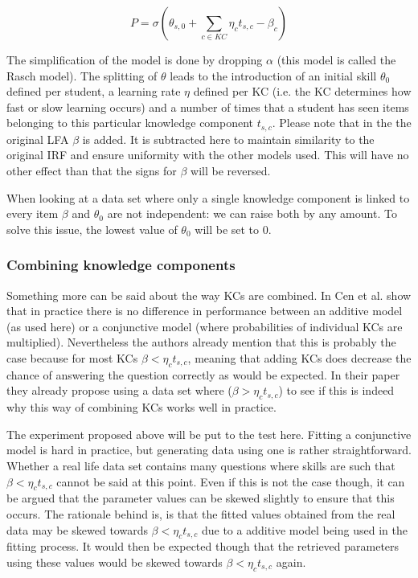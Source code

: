 \documentclass{article}
\begin{document}
\begin{equation}
P = \sigma(\theta_{s,0} + \sum_{c \in KC}  \eta_{c} t_{s,c} - \beta_{c})
\end{equation}

The simplification of the model is done by dropping $\alpha$ (this model is called the Rasch model). The splitting of $\theta$ leads to the introduction of an initial skill $\theta_{0}$ defined per student, a learning rate $\eta$ defined per KC (i.e. the KC determines how fast or slow learning occurs) and a number of times that a student has seen items belonging to this particular knowledge component $t_{s,c}$. Please note that in the the original LFA $\beta$ is added. It is subtracted here to maintain similarity to the original IRF and ensure uniformity with the other models used. This will have no other effect than that the signs for $\beta$ will be reversed.

When looking at a data set where only a single knowledge component is linked to every item $\beta$ and $\theta_{0}$ are not independent: we can raise both by any amount. To solve this issue, the lowest value of $\theta_{0}$ will be set to 0.
\subsubsection{Combining knowledge components}
\label{sec:comb}
Something more can be said about the way KCs are combined. In \cite{skillcombi} Cen et al. show that in practice there is no difference in performance between an additive model (as used here) or a conjunctive model (where probabilities of individual KCs are multiplied). Nevertheless the authors already mention that this is probably the case because for most KCs $\beta < \eta_{c} t_{s,c}$, meaning that adding KCs does decrease the chance of answering the question correctly as would be expected. In their paper they already propose using a data set where ($\beta > \eta_{c} t_{s,c}$) to see if this is indeed why this way of combining KCs works well in practice.

The experiment proposed above will be put to the test here. Fitting a conjunctive model is hard in practice, but generating data using one is rather straightforward. Whether a real life data set contains many questions where skills are such that $\beta < \eta_{c} t_{s,c}$ cannot be said at this point. Even if this is not the case though, it can be argued that the parameter values can be skewed slightly to ensure that this occurs. The rationale behind is, is that the fitted values obtained from the real data may be skewed towards $\beta < \eta_{c} t_{s,c}$ due to a additive model being used in the fitting process. It would then be expected though that the retrieved parameters using these values would be skewed towards $\beta < \eta_{c} t_{s,c}$ again.
\end{document}
